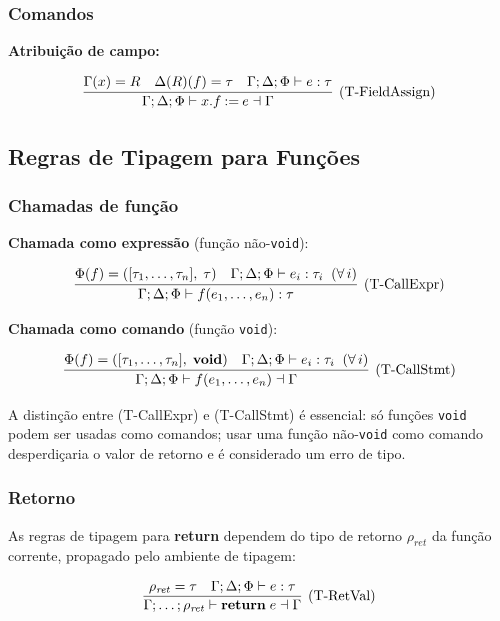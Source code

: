 \subsubsection{Comandos}

\textbf{Atribuição de campo:}

\[
  \infer[\text{(T-FieldAssign)}]
  {\Gamma;\Delta;\Phi \vdash x.f \mathbin{:=} e \dashv \Gamma}
  {\Gamma(x) = R
   \quad \Delta(R)(f) = \tau
   \quad \Gamma;\Delta;\Phi \vdash e : \tau}
\]

\subsection{Regras de Tipagem para Funções}

\subsubsection{Chamadas de função}

\textbf{Chamada como expressão} (função não-\texttt{void}):

\[
  \infer[\text{(T-CallExpr)}]
  {\Gamma;\Delta;\Phi \vdash f(e_1,\ldots,e_n) : \tau}
  {\Phi(f) = ([\tau_1,\ldots,\tau_n],\; \tau)
   \quad \Gamma;\Delta;\Phi \vdash e_i : \tau_i \;\;(\forall\,i)}
\]

\textbf{Chamada como comando} (função \texttt{void}):

\[
  \infer[\text{(T-CallStmt)}]
  {\Gamma;\Delta;\Phi \vdash f(e_1,\ldots,e_n) \dashv \Gamma}
  {\Phi(f) = ([\tau_1,\ldots,\tau_n],\; \mathbf{void})
   \quad \Gamma;\Delta;\Phi \vdash e_i : \tau_i \;\;(\forall\,i)}
\]

A distinção entre (T-CallExpr) e (T-CallStmt) é essencial: só funções
\texttt{void} podem ser usadas como comandos; usar uma função
não-\texttt{void} como comando desperdiçaria o valor de retorno e é
considerado um erro de tipo.

\subsubsection{Retorno}

As regras de tipagem para \textbf{return} dependem do tipo de retorno
\(\rho_{\mathit{ret}}\) da função corrente, propagado pelo ambiente de
tipagem:

\[
  \infer[\text{(T-RetVal)}]
  {\Gamma;\ldots;\rho_{\mathit{ret}} \vdash \mathbf{return}\; e \dashv \Gamma}
  {\rho_{\mathit{ret}} = \tau
   \quad \Gamma;\Delta;\Phi \vdash e : \tau}
\]

